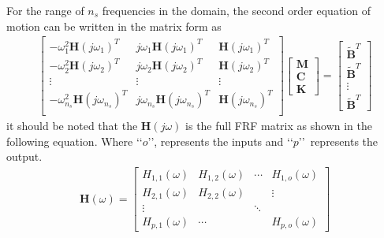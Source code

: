 \documentclass[paper=a4, fontsize=12pt]{scrartcl} %
\begin{document}
For the range of $n_s$ frequencies in the domain, the second order equation of motion can be written in the matrix form as
%
\begin{gather}\label{eq:MDOF}
\begin{bmatrix}
	-\omega_1^2 \mathbf{H}(j\omega_1)^T & j\omega_1 \mathbf{H}(j\omega_1)^T & 
	\mathbf{H}(j\omega_1)^T \\
	-\omega_2^2 \mathbf{H}(j\omega_2)^T & j\omega_2 \mathbf{H}(j\omega_2)^T & 
	\mathbf{H}(j\omega_2)^T \\
	\vdots & \vdots & \vdots \\
	-\omega_{n_s}^2 \mathbf{H}(j\omega_{n_s})^T & j\omega_{n_s} \mathbf{H}(j
	\omega_{n_s})^T & \mathbf{H}(j\omega_{n_s})^T \\
\end{bmatrix}
\begin{bmatrix}
	\mathbf{M} \\
	\mathbf{C} \\
	\mathbf{K}
\end{bmatrix}
=
\begin{bmatrix}
	\tilde{\mathbf{B}}^T \\
	\tilde{\mathbf{B}}^T \\
	\vdots \\
	\tilde{\mathbf{B}}^T
\end{bmatrix}
\end{gather}
%
it should be noted that the $\mathbf{H}(j\omega)$ is the full FRF matrix as shown in the following equation. Where \lq\lq$o$\rq\rq , represents the inputs and \lq\lq$p$\rq\rq\ represents the output.
%
\begin{gather}
\mathbf{H}(\omega) =
\begin{bmatrix}
	H_{1,1}(\omega) & H_{1,2}(\omega) & \cdots & H_{1,o}(\omega) \\
	H_{2,1}(\omega) & H_{2,2}(\omega) &  & \vdots \\
	\vdots &  & \ddots &  \\
	H_{p,1}(\omega)	& \cdots &  & H_{p,o}(\omega)
\end{bmatrix}
\end{gather}
%
\end{document}
